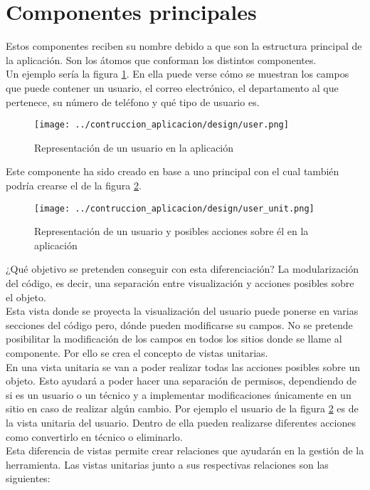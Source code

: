 \section{Componentes principales}
Estos componentes reciben su nombre debido a que son la estructura principal de la aplicación. Son los átomos que conforman los distintos componentes.
\\Un ejemplo sería la figura \ref{fig:user-view}. En ella puede verse cómo se muestran los campos que puede contener un usuario, el correo electrónico, el departamento al que pertenece, su número de teléfono y qué tipo de usuario es.
\begin{figure}[ht]
    \centering
    \texttt{[image: ../contruccion\_aplicacion/design/user.png]}
    \caption{Representación de un usuario en la aplicación}\label{fig:user-view}
\end{figure}
Este componente ha sido creado en base a uno principal con el cual también podría crearse el de la figura \ref{fig:user-unit}.
\begin{figure}[ht]
    \centering
    \texttt{[image: ../contruccion\_aplicacion/design/user\_unit.png]}
    \caption{Representación de un usuario y posibles acciones sobre él en la aplicación}\label{fig:user-unit}
\end{figure}
¿Qué objetivo se pretenden conseguir con esta diferenciación? La modularización del código, es decir, una separación entre visualización y acciones posibles sobre el objeto.
\\Esta vista donde se proyecta la visualización del usuario puede ponerse en varias secciones del código pero, dónde pueden modificarse su campos. No se pretende posibilitar la modificación de los campos en todos los sitios donde se llame al componente. Por ello se crea el concepto de vistas unitarias.
\\En una vista unitaria se van a poder realizar todas las acciones posibles sobre un objeto. Esto ayudará a poder hacer una separación de permisos, dependiendo de si es un usuario o un técnico y a implementar modificaciones únicamente en un sitio en caso de realizar algún cambio. Por ejemplo el usuario de la figura \ref{fig:user-unit} es de la vista unitaria del usuario. Dentro de ella pueden realizarse diferentes acciones como convertirlo en técnico o eliminarlo.
\\Esta diferencia de vistas permite crear relaciones que ayudarán en la gestión de la herramienta. Las vistas unitarias junto a sus respectivas relaciones son las siguientes:

